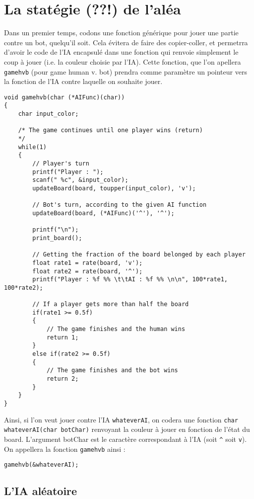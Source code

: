 \documentclass[a4paper,11pt]{article}
\begin{document}
	
	
	\section{La statégie (??!) de l'aléa}
	
	
	Dans un premier temps, codons une fonction g\'en\'erique pour jouer une partie contre un bot, quelqu'il soit. Cela \'evitera de faire des copier-coller, et permetrra d'avoir le code de l'IA encapsul\'e dans une fonction qui renvoie simplement le coup \`a jouer (i.e. la couleur choisie par l'IA).
	Cette fonction, que l'on apellera \texttt{gamehvb} (pour game human v. bot) prendra comme param\`etre un pointeur vers la fonction de l'IA contre laquelle on souhaite jouer.
	
	\begin{lstlisting}
void gamehvb(char (*AIFunc)(char))
{	
	char input_color;
	
	/* The game continues until one player wins (return)
	*/
	while(1)
	{
		// Player's turn
		printf("Player : ");
		scanf(" %c", &input_color);
		updateBoard(board, toupper(input_color), 'v');
		
		// Bot's turn, according to the given AI function
		updateBoard(board, (*AIFunc)('^'), '^');
		
		printf("\n");
		print_board();
		
		// Getting the fraction of the board belonged by each player
		float rate1 = rate(board, 'v');
		float rate2 = rate(board, '^');
		printf("Player : %f %% \t\tAI : %f %% \n\n", 100*rate1, 100*rate2);
		
		// If a player gets more than half the board
		if(rate1 >= 0.5f)
		{
			// The game finishes and the human wins
			return 1;
		}
		else if(rate2 >= 0.5f)
		{
			// The game finishes and the bot wins
			return 2;
		}
	}
}\end{lstlisting}
	
Ainsi, si l'on veut jouer contre l'IA \texttt{whateverAI}, on codera une fonction \texttt{char whateverAI(char botChar)} renvoyant la couleur \`a jouer en fonction de l'\'etat du board. L'argument botChar est le caract\`ere correspondant \`a l'IA (soit \texttt{\^} soit \texttt{v}). On appellera la fonction \texttt{gamehvb} ainsi :
	
	\begin{lstlisting}
gamehvb(&whateverAI);\end{lstlisting}
	
	
	\subsection{L'IA al\'eatoire}
	
\end{document}
